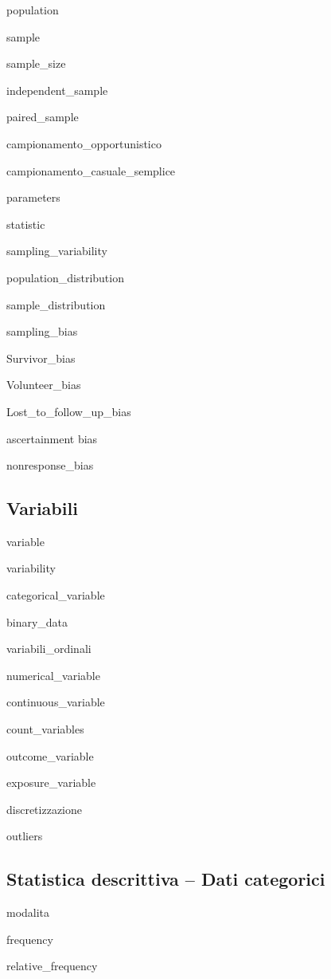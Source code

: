 \documentclass{report}
\begin{document}
\gls{population}

\gls{sample}

\gls{sample_size}

\gls{independent_sample}

\gls{paired_sample}

\gls{campionamento_opportunistico}

\gls{campionamento_casuale_semplice}

\gls{parameters}

\gls{statistic}

\gls{sampling_variability}

\gls{population_distribution}

\gls{sample_distribution}

\gls{sampling_bias}

\gls{Survivor_bias}

\gls{Volunteer_bias}

\gls{Lost_to_follow_up_bias}

\gls{ascertainment bias}

\gls{nonresponse_bias}




\subsection*{Variabili}

\gls{variable}

\gls{variability}

\gls{categorical_variable}

\gls{binary_data}

\gls{variabili_ordinali}

\gls{numerical_variable}

\gls{continuous_variable}

\gls{count_variables}

\gls{outcome_variable}

\gls{exposure_variable}

\gls{discretizzazione}

\gls{outliers}



\subsection*{Statistica descrittiva -- Dati categorici}

\gls{modalita}

\gls{frequency}

\gls{relative_frequency}
\end{document}
